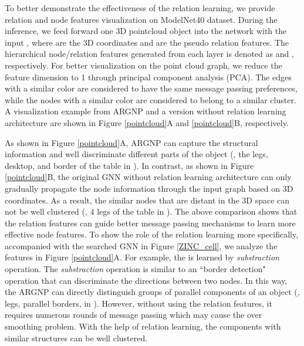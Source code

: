 To better demonstrate the effectiveness of the relation learning, we provide relation and node features visualization on ModelNet40 dataset. 
During the inference, we feed forward one 3D pointcloud object into the network with the input , where  are the 3D coordinates and  are the pseudo relation features. 
The hierarchical node/relation features generated from each layer is denoted as  and , respectively. 
For better visualization on the point cloud graph, we reduce the feature dimension to 1 through principal component analysis (PCA).
The edges with a similar color are considered to have the same message passing preferences, while the nodes with a similar color are considered to belong to a similar cluster. 
A visualization example from ARGNP and a version without relation learning architecture are shown in Figure \ref{pointcloud}A and \ref{pointcloud}B, respectively. 

As shown in Figure \ref{pointcloud}A, ARGNP can capture the structural information and well discriminate different parts of the object (\eg, the legs, desktop, and border of the table in ). 
In contrast, as shown in Figure \ref{pointcloud}B, the original GNN without relation learning architecture can only gradually propagate the node information through the input graph based on 3D coordinates. 
As a result, the similar nodes that are distant in the 3D space can not be well clustered (\eg, 4 legs of the table in ). 
The above comparison shows that the relation features can guide better message passing mechanisms to learn more effective node features. 
To show the role of the relation learning more specifically, accompanied with the searched GNN in Figure \ref{ZINC_cell}, we analyze the features in Figure \ref{pointcloud}A. 
For example, the  is learned by \emph{substraction} operation. The \emph{substraction} operation is similar to an ``border detection" operation that can discriminate the directions between two nodes. 
In this way, the ARGNP can directly distinguish groups of parallel components of an object (\eg, legs, parallel borders, \etc in ). 
However, without using the relation features, it requires numerous rounds of message passing which may cause the over smoothing problem. 
With the help of relation learning, the components with similar structures can be well clustered. 








